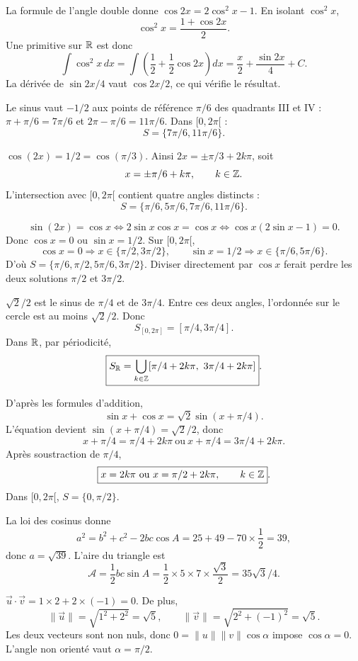 La formule de l'angle double donne \(\cos2x=2\cos^2x-1\). En isolant \(\cos^2x\),
\[\boxed{\cos^2x=\frac{1+\cos2x}{2}}.\]
Une primitive sur \(\mathbb{R}\) est donc
\[\int\cos^2x\,dx=\int\left(\frac12+\frac12\cos2x\right)dx
=\boxed{\frac x2+\frac{\sin2x}{4}+C}.\]
La dérivée de \(\sin2x/4\) vaut \(\cos2x/2\), ce qui vérifie le résultat.

Le sinus vaut \(-1/2\) aux points de référence \(\pi/6\) des quadrants III et IV : \(\pi+\pi/6=7\pi/6\) et \(2\pi-\pi/6=11\pi/6\). Dans \([0,2\pi[\) :
\[\boxed{S=\{7\pi/6,11\pi/6\}}.\]

\(\cos(2x)=1/2=\cos(\pi/3)\). Ainsi \(2x=\pm\pi/3+2k\pi\), soit
\[x=\pm\pi/6+k\pi,\qquad k\in\mathbb{Z}.\]
L'intersection avec \([0,2\pi[\) contient quatre angles distincts :
\[\boxed{S=\{\pi/6,5\pi/6,7\pi/6,11\pi/6\}}.\]

\[\sin(2x)=\cos x\iff 2\sin x\cos x=\cos x
\iff\cos x(2\sin x-1)=0.\]
Donc \(\cos x=0\) ou \(\sin x=1/2\). Sur \([0,2\pi[\),
\[\cos x=0\Rightarrow x\in\{\pi/2,3\pi/2\},\qquad
\sin x=1/2\Rightarrow x\in\{\pi/6,5\pi/6\}.\]
D'où \(\boxed{S=\{\pi/6,\pi/2,5\pi/6,3\pi/2\}}\). Diviser directement par \(\cos x\) ferait perdre les deux solutions \(\pi/2\) et \(3\pi/2\).

\(\sqrt2/2\) est le sinus de \(\pi/4\) et de \(3\pi/4\). Entre ces deux angles, l'ordonnée sur le cercle est au moins \(\sqrt2/2\). Donc
\[\boxed{S_{[0,2\pi]}=[\pi/4,3\pi/4]}.\]
Dans \(\mathbb{R}\), par périodicité,
\[\boxed{S_\R=\bigcup_{k\in\Z}[\pi/4+2k\pi,\ 3\pi/4+2k\pi]}.\]

D'après les formules d'addition,
\[\sin x+\cos x=\sqrt2\sin(x+\pi/4).\]
L'équation devient \(\sin(x+\pi/4)=\sqrt2/2\), donc
\[x+\pi/4=\pi/4+2k\pi\ \text{ou}\ x+\pi/4=3\pi/4+2k\pi.\]
Après soustraction de \(\pi/4\),
\[\boxed{x=2k\pi\ \text{ou}\ x=\pi/2+2k\pi,\qquad k\in\Z}.\]
Dans \([0,2\pi[\), \(\boxed{S=\{0,\pi/2\}}\).

La loi des cosinus donne
\[a^2=b^2+c^2-2bc\cos A=25+49-70\times\frac12=39,\]
donc \(\boxed{a=\sqrt{39}}\). L'aire du triangle est
\[\mathcal A=\frac12bc\sin A=\frac12\times5\times7\times\frac{\sqrt3}2
=\boxed{35\sqrt3/4}.\]

\(\vec u\cdot\vec v=1\times2+2\times(-1)=0\). De plus,
\[\|\vec u\|=\sqrt{1^2+2^2}=\sqrt5,\qquad
\|\vec v\|=\sqrt{2^2+(-1)^2}=\sqrt5.\]
Les deux vecteurs sont non nuls, donc \(0=\|u\|\|v\|\cos\alpha\) impose \(\cos\alpha=0\). L'angle non orienté vaut \(\boxed{\alpha=\pi/2}\).

